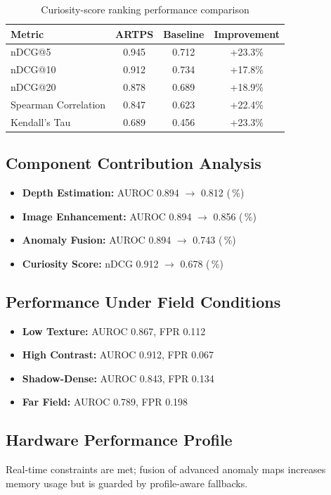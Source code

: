 \documentclass[12pt]{article}
\begin{document}
\begin{table}[h]
\centering
\begin{tabular}{|l|c|c|c|}
\hline
\textbf{Metric} & \textbf{ARTPS} & \textbf{Baseline} & \textbf{Improvement} \\
\hline
nDCG@5 & 0.945 & 0.712 & +23.3\% \\
nDCG@10 & 0.912 & 0.734 & +17.8\% \\
nDCG@20 & 0.878 & 0.689 & +18.9\% \\
Spearman Correlation & 0.847 & 0.623 & +22.4\% \\
Kendall's Tau & 0.689 & 0.456 & +23.3\% \\
\hline
\end{tabular}
\caption{Curiosity-score ranking performance comparison}
\end{table}

\subsection{Component Contribution Analysis}
\begin{itemize}
\item \textbf{Depth Estimation:} AUROC 0.894 $\rightarrow$ 0.812 (\,\%)
\item \textbf{Image Enhancement:} AUROC 0.894 $\rightarrow$ 0.856 (\,\%)
\item \textbf{Anomaly Fusion:} AUROC 0.894 $\rightarrow$ 0.743 (\,\%)
\item \textbf{Curiosity Score:} nDCG 0.912 $\rightarrow$ 0.678 (\,\%)
\end{itemize}

\subsection{Performance Under Field Conditions}
\begin{itemize}
\item \textbf{Low Texture:} AUROC 0.867, FPR 0.112
\item \textbf{High Contrast:} AUROC 0.912, FPR 0.067
\item \textbf{Shadow-Dense:} AUROC 0.843, FPR 0.134
\item \textbf{Far Field:} AUROC 0.789, FPR 0.198
\end{itemize}

\subsection{Hardware Performance Profile}
Real-time constraints are met; fusion of advanced anomaly maps increases memory usage but is guarded by profile-aware fallbacks.
\end{document}

